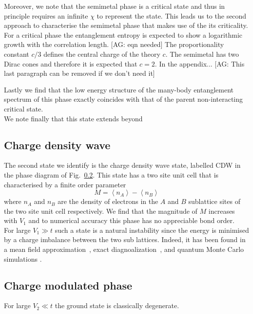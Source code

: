 \documentclass[aps,prx,10pt,twocolumn,floatfix,superscriptaddress,showpacs,numerical,footinbib]{revtex4-1}
\newcommand{\noteAG}[1]{{\color{blue} [AG: #1]}}
\begin{document}
%
Moreover, we note that the semimetal phase is a critical state and thus in principle requires an infinite $\chi$ to represent the state.
%
This leads us to the second approach to characterise the semimetal phase that makes use of the its criticality.
%
For a critical phase the entanglement entropy is expected to show a logarithmic growth with the correlation length.
\noteAG{eqn needed}
%
The proportionality constant $c/3$ defines the central charge of the theory $c$. 
%
The semimetal has two Dirac cones and therefore it is expected that $c=2$. 
%
In the appendix...
\noteAG{This last paragraph can be removed if we don't need it}

%
Lastly we find that the low energy structure of the many-body 
entanglement spectrum of this phase exactly coincides with that of the parent non-interacting critical state.\\ 
%

%
We note finally that this state extends beyond 

\subsection{Charge density wave}
%
The second state we identify is the charge density wave state, labelled CDW in the phase diagram of Fig.~\ref{}.
%
This state has a two site unit cell that is characterised by a finite order parameter
%
\begin{equation}
\label{eq:CDW}
%
M=\left\langle n_{A} \right\rangle-\left\langle n_{B}\right\rangle
%
\end{equation}
%
where $n_{A}$ and $n_{B}$ are the density of electrons in the $A$ and $B$ sublattice sites of the two site unit cell respectively.
%
We find that the magnitude of $M$ increases with $V_{1}$ and to numerical accuracy this phase has no appreciable bond order.\\
%

For large $V_{1}\gg t$ such a state is a natural instability since the energy is minimised by a charge imbalance between the two sub lattices.
%
Indeed, it has been found in a mean field approximation~\cite{Raghu,Franz,us}, exact diagnoalization~\cite{us,daghofer,herbut}, and quantum Monte Carlo simulations
\cite{QMC}.
%


\subsection{Charge modulated phase}
%
For large $V_{2}\ll t$ the ground state is classically degenerate. 
\end{document}
